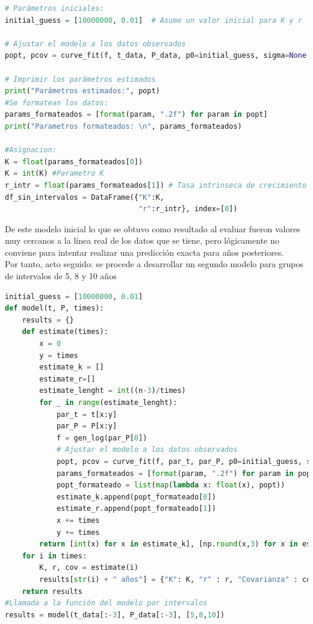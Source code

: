 \documentclass[a4paper,10pt,twocolumn]{article}
\begin{document}
\begin{lstlisting}[language=Python, caption=Estimación de parámetros con la función sin intervalos]
# Parámetros iniciales:
initial_guess = [10000000, 0.01]  # Asume un valor inicial para K y r

# Ajustar el modelo a los datos observados
popt, pcov = curve_fit(f, t_data, P_data, p0=initial_guess, sigma=None, absolute_sigma=False)

# Imprimir los parámetros estimados
print("Parámetros estimados:", popt)
#Se formatean los datos:
params_formateados = [format(param, ".2f") for param in popt]
print("Parametros formateados: \n", params_formateados)

#Asignacion:
K = float(params_formateados[0])
K = int(K) #Parametro K
r_intr = float(params_formateados[1]) # Tasa intrinseca de crecimiento r
df_sin_intervalos = DataFrame({"K":K, 
                               "r":r_intr}, index=[0])
\end{lstlisting}
De este modelo inicial lo que se obtuvo como resultado al evaluar fueron valores muy cercanos a la línea real de los datos que se tiene, pero lógicamente no conviene para intentar realizar una predicción exacta para años posteriores.\\
Por tanto, acto seguido: se procede a desarrollar un segundo modelo para grupos de intervalos de 5, 8 y 10 años

\begin{lstlisting}[language=Python, caption=Estimación de parámetros de la función con intervalos]
initial_guess = [10000000, 0.01]
def model(t, P, times):
    results = {}
    def estimate(times):
        x = 0
        y = times
        estimate_k = []
        estimate_r=[]
        estimate_lenght = int((n-3)/times)
        for _ in range(estimate_lenght):
            par_t = t[x:y]
            par_P = P[x:y]
            f = gen_log(par_P[0]) 
            # Ajustar el modelo a los datos observados
            popt, pcov = curve_fit(f, par_t, par_P, p0=initial_guess, sigma=None, absolute_sigma=False)
            params_formateados = [format(param, ".2f") for param in popt]
            popt_formateado = list(map(lambda x: float(x), popt))
            estimate_k.append(popt_formateado[0])
            estimate_r.append(popt_formateado[1])
            x += times
            y += times
        return [int(x) for x in estimate_k], [np.round(x,3) for x in estimate_r], pcov
    for i in times:
        K, r, cov = estimate(i)
        results[str(i) + " años"] = {"K": K, "r" : r, "Covarianza" : cov}
    return results
#Llamada a la función del modelo por intervalos
results = model(t_data[:-3], P_data[:-3], [5,8,10])
\end{lstlisting}
\end{document}
